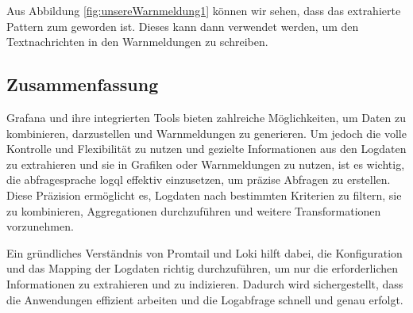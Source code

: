 Aus Abbildung \ref{fig:unsereWarnmeldung1} können wir sehen, dass das extrahierte Pattern zum  geworden ist. Dieses kann dann verwendet werden, um den Textnachrichten in den Warnmeldungen zu schreiben.


\newpage
\subsection{Zusammenfassung}
Grafana und ihre integrierten Tools bieten zahlreiche Möglichkeiten, um Daten zu kombinieren, darzustellen und Warnmeldungen zu generieren. Um jedoch die volle Kontrolle und Flexibilität zu nutzen und gezielte Informationen aus den Logdaten zu extrahieren und sie in Grafiken oder Warnmeldungen zu nutzen, ist es wichtig, die \gls{abfragesprache} \gls{logql} effektiv einzusetzen, um präzise Abfragen zu erstellen. Diese Präzision ermöglicht es, Logdaten nach bestimmten Kriterien zu filtern, sie zu kombinieren, Aggregationen durchzuführen und weitere Transformationen vorzunehmen.

Ein gründliches Verständnis von Promtail und Loki hilft dabei, die Konfiguration und das Mapping der Logdaten richtig durchzuführen, um nur die erforderlichen Informationen zu extrahieren und zu indizieren. Dadurch wird sichergestellt, dass die Anwendungen effizient arbeiten und die Logabfrage schnell und genau erfolgt.


